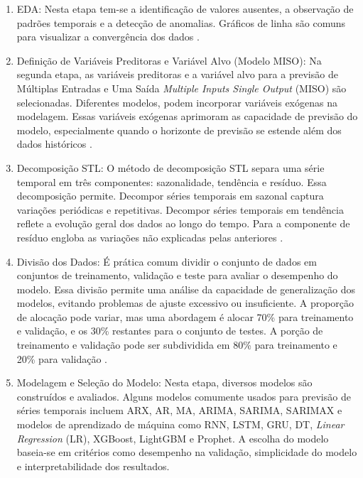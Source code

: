 \begin{enumerate}
	
	\item {EDA}: Nesta etapa  tem-se a identificação de valores ausentes, a observação de padrões temporais e a detecção de anomalias. Gráficos de linha são comuns para visualizar a convergência dos dados \cite{Rostam2021108249}.
	
	\item {Definição de Variáveis Preditoras e Variável Alvo (Modelo MISO)}: Na segunda etapa, as variáveis preditoras e a variável alvo para a previsão de Múltiplas Entradas e Uma Saída \textit{Multiple Inputs Single Output} (MISO) são selecionadas. Diferentes modelos, podem incorporar variáveis exógenas na modelagem. Essas variáveis exógenas aprimoram as capacidade de previsão do modelo, especialmente quando o horizonte de previsão se estende além dos dados históricos \cite{PAWLOWSKI202298}. 
	
	\item {Decomposição STL}: O método de decomposição STL separa uma série temporal em três componentes: sazonalidade, tendência e resíduo. Essa decomposição permite. Decompor séries temporais em sazonal captura variações periódicas e repetitivas. Decompor séries temporais em tendência reflete a evolução geral dos dados ao longo do tempo. Para a componente de resíduo engloba as variações não explicadas pelas anteriores \cite{Bandara2021}.
	
	\item {Divisão dos Dados}: É prática comum dividir o conjunto de dados em conjuntos de treinamento, validação e teste para avaliar o desempenho do modelo. Essa divisão permite uma análise da capacidade de generalização dos modelos, evitando problemas de ajuste excessivo ou insuficiente. A proporção de alocação pode variar, mas uma abordagem é alocar 70\% para treinamento e validação, e os 30\% restantes para o conjunto de testes. A porção de treinamento e validação pode ser subdividida em 80\% para treinamento e 20\% para validação \cite{Tao2020}.
	
	\item {Modelagem e Seleção do Modelo}: Nesta etapa, diversos modelos são construídos e avaliados. Alguns modelos comumente usados para previsão de séries temporais incluem ARX, AR, MA, ARIMA, SARIMA, SARIMAX  e modelos de aprendizado de máquina como RNN, LSTM, GRU, DT, \textit{Linear Regression} (LR), XGBoost, LightGBM e Prophet. A escolha do modelo baseia-se em critérios como desempenho na validação, simplicidade do modelo e interpretabilidade dos resultados.
	

\end{enumerate}
